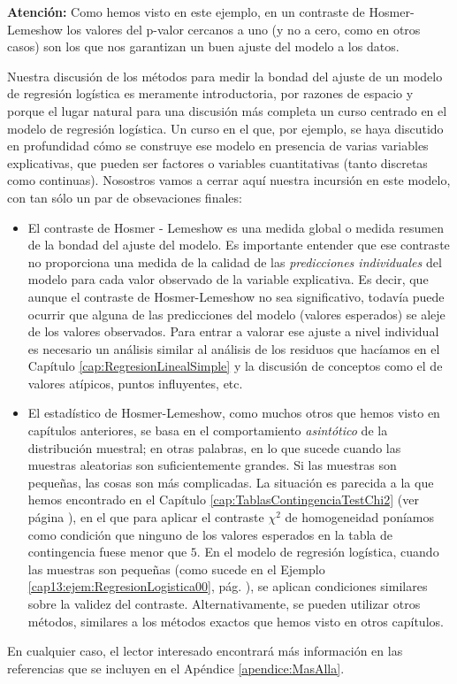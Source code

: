 {\bf Atención:} Como hemos visto en este ejemplo, en un contraste de Hosmer-Lemeshow los valores del p-valor cercanos a uno (y no a cero, como en otros casos) son los que nos garantizan un buen ajuste del modelo a los datos.

Nuestra discusión de los métodos para medir la bondad del ajuste de un modelo de regresión logística es meramente introductoria, por razones de espacio y porque el lugar natural para una discusión más completa un curso centrado en el modelo de regresión  logística. Un curso en el que, por ejemplo, se haya discutido en profundidad cómo se construye ese modelo en presencia de varias variables explicativas, que pueden ser factores o variables cuantitativas (tanto discretas como
continuas). Nosostros vamos a cerrar aquí nuestra incursión en este modelo, con tan sólo un par de obsevaciones finales:

\begin{itemize}
	\item El contraste de Hosmer - Lemeshow es una medida {\sf global} o {\sf medida resumen} de la bondad del ajuste del modelo. Es importante entender que ese contraste no proporciona una medida de la calidad de las {\em predicciones individuales} del modelo para cada valor observado de la variable explicativa. Es decir, que aunque el contraste de Hosmer-Lemeshow no sea significativo, todavía puede ocurrir que alguna de las predicciones del modelo (valores esperados) se aleje de los valores observados. Para entrar a valorar ese ajuste a nivel individual es necesario un análisis similar al análisis de los residuos que hacíamos en el Capítulo \ref{cap:RegresionLinealSimple} y la discusión de conceptos como el de valores atípicos, puntos influyentes, etc.
	
	\item El estadístico de Hosmer-Lemeshow, como muchos otros que  hemos visto en capítulos anteriores, se basa  en el comportamiento {\em asintótico} de la distribución muestral; en otras palabras, en lo que sucede cuando las muestras aleatorias son suficientemente grandes. Si las muestras son pequeñas, las cosas son más complicadas. La situación es parecida a la que hemos encontrado en el Capítulo \ref{cap:TablasContingenciaTestChi2} (ver página \pageref{cap12:ecu:ContrasteChi2Homogeneidad}), en el que para aplicar el contraste $\chi^2$ de homogeneidad  poníamos como condición que ninguno de los valores esperados en la tabla de contingencia fuese menor que $5$.  En el modelo de regresión logística, cuando las muestras son pequeñas (como sucede en el Ejemplo \ref{cap13:ejem:RegresionLogistica00}, pág. \pageref{cap13:ejem:RegresionLogistica00}), se aplican condiciones similares sobre la validez del contraste. Alternativamente, se pueden utilizar otros métodos, similares a los métodos exactos que hemos visto en otros capítulos.
\end{itemize}
En cualquier caso, el lector interesado encontrará más información en las referencias que se incluyen en el Apéndice \ref{apendice:MasAlla}.

